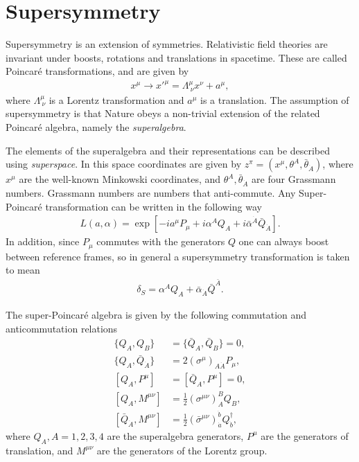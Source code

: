 \documentclass[twoside,english]{uiofysmaster}
\begin{document}
\section{Supersymmetry}

Supersymmetry is an extension of symmetries. Relativistic field theories are invariant under boosts, rotations and translations in spacetime. These are called Poincar\'{e} transformations, and are given by
\begin{align}
x^{\mu} \rightarrow x'^{\mu} = \Lambda^{\mu}_{\ \nu} x^{\nu} + a^{\mu}, 
\end{align}
where $\Lambda^{\mu}_{\ \nu}$ is a Lorentz transformation and $a^{\mu}$ is a translation. The assumption of supersymmetry is that Nature obeys a non-trivial extension of the related Poincar\'{e} algebra, namely the \textit{superalgebra}. 

The elements of the superalgebra and their representations can be described using \textit{superspace}. In this space coordinates are given by $z^{\pi} = (x^{\mu}, \theta^A, \bar{\theta}_{\dot{A}})$, where $x^{\mu}$ are the well-known Minkowski coordinates, and $\theta^A, \bar{\theta}_{\dot{A}}$ are four Grassmann numbers. Grassmann numbers are numbers that anti-commute. Any Super-Poincar\'{e} transformation can be written in the following way
\begin{align}
L(a, \alpha) = \exp [-i a^{\mu} P_{\mu} + i \alpha^A Q_A + i \bar{\alpha}^{\dot{A}} \bar{Q}_{\dot{A}} ].
\end{align}
In addition, since $P_{\mu}$ commutes with the generators $Q$ one can always boost between reference frames, so in general a supersymmetry transformation is taken to mean
\begin{align}
\delta_S = \alpha^A Q_A + \bar{\alpha}_{\dot{A}} \bar{Q}^{\bar{A}}.
\end{align}


The super-Poincar\'{e} algebra is given by the following commutation and anticommutation relations \cite{kvellestad2015chasing}
\begin{align}
\{Q_A, Q_B \} &= \{ \bar{Q}_A, \bar{Q}_B\} = 0,\\
\{Q_A, \bar{Q}_{\dot{A}} \} &= 2 (\sigma^{\mu})_{A \dot{A}} P_{\mu},\\
[Q_A, P^{\mu}] &= [\bar{Q}_A, P^{\mu}] = 0,\label{Eq:: [Q,P]}\\
[Q_A, M^{\mu \nu}] &= \frac{1}{2} (\sigma^{\mu \nu})_A^B Q_B,\\
[\bar{Q}_{\dot{A}}, M^{\mu \nu}] &= \frac{1}{2} (\bar{\sigma}^{\mu \nu})_{\dot{a}}^{\dot{b}} Q_{\dot{b}}^{\dagger},  
\end{align}
where $Q_A, A=1,2,3,4$ are the superalgebra generators, $P^{\mu}$ are the generators of translation, and $M^{\mu \nu}$ are the generators of the Lorentz group. 
\end{document}
